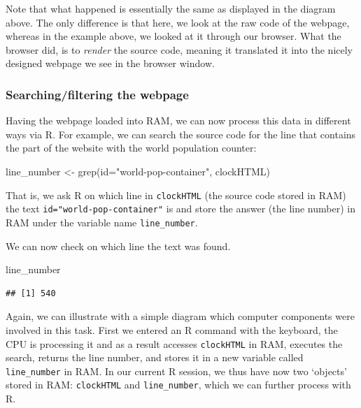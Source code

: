 \documentclass[
  12pt,
]{style/krantz}
\newenvironment{Shaded}{\begin{snugshade}}{\end{snugshade}}
\newcommand{\FunctionTok}[1]{\textcolor[rgb]{0.00,0.00,0.00}{#1}}
\newcommand{\NormalTok}[1]{#1}
\newcommand{\OtherTok}[1]{\textcolor[rgb]{0.56,0.35,0.01}{#1}}
\newcommand{\StringTok}[1]{\textcolor[rgb]{0.31,0.60,0.02}{#1}}
\begin{document}
Note that what happened is essentially the same as displayed in the diagram above. The only difference is that here, we look at the raw code of the webpage, whereas in the example above, we looked at it through our browser. What the browser did, is to \emph{render} the source code, meaning it translated it into the nicely designed webpage we see in the browser window.

\hypertarget{searchingfiltering-the-webpage}{%
\subsubsection{Searching/filtering the webpage}\label{searchingfiltering-the-webpage}}

Having the webpage loaded into RAM, we can now process this data in different ways via R. For example, we can search the source code for the line that contains the part of the website with the world population counter:

\begin{Shaded}
\begin{Highlighting}[]
\NormalTok{line\_number }\OtherTok{\textless{}{-}} \FunctionTok{grep}\NormalTok{(}\StringTok{\textquotesingle{}id="world{-}pop{-}container"\textquotesingle{}}\NormalTok{, clockHTML)}
\end{Highlighting}
\end{Shaded}

That is, we ask R on which line in \texttt{clockHTML} (the source code stored in RAM) the text \texttt{id="world-pop-container"} is and store the answer (the line number) in RAM under the variable name \texttt{line\_number}.

We can now check on which line the text was found.

\begin{Shaded}
\begin{Highlighting}[]
\NormalTok{line\_number}
\end{Highlighting}
\end{Shaded}

\begin{verbatim}
## [1] 540
\end{verbatim}

Again, we can illustrate with a simple diagram which computer components were involved in this task. First we entered an R command with the keyboard, the CPU is processing it and as a result accesses \texttt{clockHTML} in RAM, executes the search, returns the line number, and stores it in a new variable called \texttt{line\_number} in RAM. In our current R session, we thus have now two `objects' stored in RAM: \texttt{clockHTML} and \texttt{line\_number}, which we can further process with R.
\end{document}
